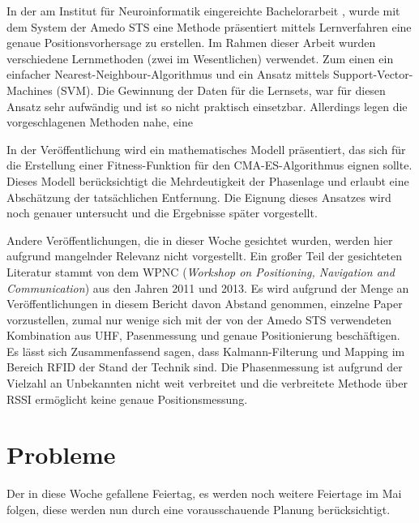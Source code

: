 \documentclass[a4paper,12pt,fleqn]{article}
\begin{document}
In der am Institut für Neuroinformatik eingereichte Bachelorarbeit \cite{Muz1}, wurde mit dem System der Amedo STS eine Methode präsentiert mittels Lernverfahren eine genaue Positionsvorhersage zu erstellen. Im Rahmen dieser Arbeit wurden verschiedene Lernmethoden (zwei im Wesentlichen) verwendet. Zum einen ein einfacher Nearest-Neighbour-Algorithmus und ein Ansatz mittels Support-Vector-Machines (SVM). Die Gewinnung der Daten für die Lernsets, war für diesen Ansatz sehr aufwändig und ist so nicht praktisch einsetzbar. Allerdings legen die vorgeschlagenen Methoden nahe, eine 

In der Veröffentlichung \cite{Wil1} wird ein mathematisches Modell präsentiert, das sich für die Erstellung einer Fitness-Funktion für den CMA-ES-Algorithmus eignen sollte. Dieses Modell berücksichtigt die Mehrdeutigkeit der Phasenlage und erlaubt eine Abschätzung der tatsächlichen Entfernung. Die Eignung dieses Ansatzes wird noch genauer untersucht und die Ergebnisse später vorgestellt.

Andere Veröffentlichungen, die in dieser Woche gesichtet wurden, werden hier aufgrund mangelnder Relevanz nicht vorgestellt. Ein großer Teil der gesichteten Literatur stammt von dem WPNC (\textit{Workshop on Positioning, Navigation and Communication}) aus den Jahren 2011 und 2013. Es wird aufgrund der Menge an Veröffentlichungen in diesem Bericht davon Abstand genommen, einzelne Paper vorzustellen, zumal nur wenige sich mit der von der Amedo STS verwendeten Kombination aus UHF, Pasenmessung und genaue Positionierung beschäftigen. Es lässt sich Zusammenfassend sagen, dass Kalmann-Filterung und Mapping im Bereich RFID der Stand der Technik sind. Die Phasenmessung ist aufgrund der Vielzahl an Unbekannten nicht weit verbreitet und die verbreitete Methode über RSSI ermöglicht keine genaue Positionsmessung.

\section[Probleme]{Probleme}
Der in diese Woche gefallene Feiertag, es werden noch weitere Feiertage im Mai folgen, diese werden nun durch eine vorausschauende Planung berücksichtigt.



\newpage


\end{document}
